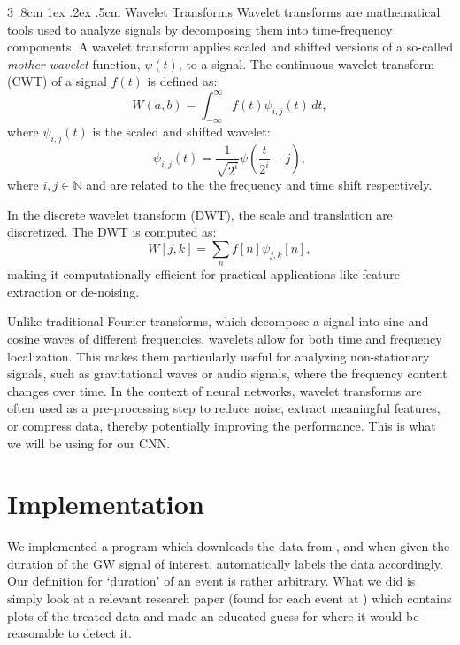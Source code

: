 \documentclass[%
reprint,
amsmath,amssymb,
aps,
]{revtex4-2}
\makeatletter
\renewcommand{\subsubsection}{%
	\@startsection
	{subsubsection}%
	{3}%
	{\z@}%
	{.8cm \@plus1ex \@minus .2ex}%
	{.5cm}%
	{\normalfont\small\centering}%
}
\makeatother
\begin{document}
\subsubsection{Wavelet Transforms}
Wavelet transforms are mathematical tools used to analyze signals by decomposing them into time-frequency components. A wavelet transform applies scaled and shifted versions of a so-called \textit{mother wavelet} function, $\psi(t)$, to a signal. The continuous wavelet transform (CWT) of a signal $f(t)$ is defined as:
\[W(a,b)=\int_{-\infty}^{\infty}f(t)\psi_{i,j}(t)\,dt,\]
where $\psi_{i,j}(t)$ is the scaled and shifted wavelet:
\[\psi_{i,j}(t)=\frac{1}{\sqrt{2^i}}\psi\left(\frac{t}{2^i}-j\right),\]
where $i,j\in\mathbb{N}$ and are related to the the frequency and time shift respectively.

In the discrete wavelet transform (DWT), the scale and translation are discretized. The DWT is computed as:
\[W[j,k]=\sum_{n}f[n]\psi_{j,k}[n],\]
making it computationally efficient for practical applications like feature extraction or de-noising.

Unlike traditional Fourier transforms, which decompose a signal into sine and cosine waves of different frequencies, wavelets allow for both time and frequency localization. This makes them particularly useful for analyzing non-stationary signals, such as gravitational waves or audio signals, where the frequency content changes over time. In the context of neural networks, wavelet transforms are often used as a pre-processing step to reduce noise, extract meaningful features, or compress data, thereby potentially improving the performance. This is what we will be using for our CNN.

\section{Implementation}
\label{sec:implementation}
We implemented a program which downloads the data from \cite{gwosc}, and when given the duration of the GW signal of interest, automatically labels the data accordingly. Our definition for `duration' of an event is rather arbitrary. What we did is simply look at a relevant research paper (found for each event at \cite{gwosc_all_events}) which contains plots of the treated data and made an educated guess for where it would be reasonable to detect it. 
\end{document}

